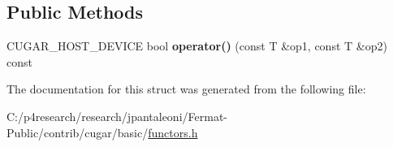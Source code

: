 \subsection*{Public Methods}
\begin{DoxyCompactItemize}
\item 
\mbox{\label{structcugar_1_1not__equal__functor_a99feba3ca347e405296b620b1c53ddb2}} 
C\+U\+G\+A\+R\+\_\+\+H\+O\+S\+T\+\_\+\+D\+E\+V\+I\+CE bool {\bfseries operator()} (const T \&op1, const T \&op2) const
\end{DoxyCompactItemize}


The documentation for this struct was generated from the following file\+:\begin{DoxyCompactItemize}
\item 
C\+:/p4research/research/jpantaleoni/\+Fermat-\/\+Public/contrib/cugar/basic/\hyperlink{functors_8h}{functors.\+h}\end{DoxyCompactItemize}
